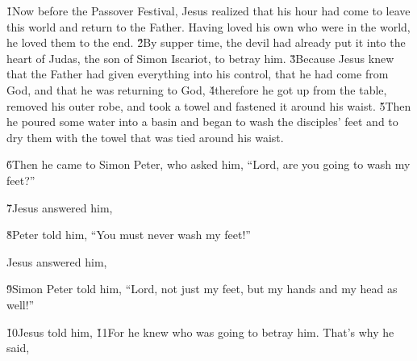 \v{1}Now before the Passover Festival, Jesus realized that his hour had come to leave this world and return to the Father. Having loved his own who were in the world, he loved them to the end. \v{2}By supper time, the devil had already put it into the heart of Judas, the son of Simon Iscariot, to betray him. \v{3}Because Jesus knew that the Father had given everything into his control, that he had come from God, and that he was returning to God, \v{4}therefore he got up from the table, removed his outer robe, and took a towel and fastened it around his waist. \v{5}Then he poured some water into a basin and began to wash the disciples' feet and to dry them with the towel that was tied around his waist.

\v{6}Then he came to Simon Peter, who asked him, ``Lord, are you going to wash my feet?''

\v{7}Jesus answered him, 

\v{8}Peter told him, ``You must never wash my feet!''

Jesus answered him, 

\v{9}Simon Peter told him, ``Lord, not just my feet, but my hands and my head as well!''

\v{10}Jesus told him,  \v{11}For he knew who was going to betray him. That's why he said, 

